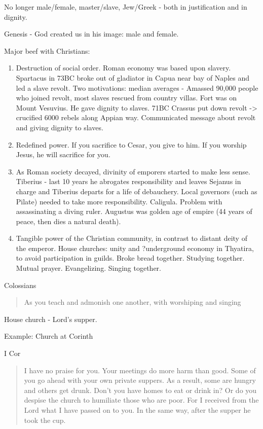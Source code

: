\documentclass[
]{book}
\begin{document}
No longer male/female, master/slave, Jew/Greek - both in justification and in dignity.

Genesis - God created us in his image: male and female.

Major beef with Christians:

\begin{enumerate}
\def\labelenumi{\arabic{enumi})}
\item
  Destruction of social order. Roman economy was based upon slavery. Spartacus in 73BC broke out of gladiator in Capua near bay of Naples and led a slave revolt. Two motivations: median averages - Amassed 90,000 people who joined revolt, most slaves rescued from country villas. Fort was on Mount Vesuvius. He gave dignity to slaves. 71BC Crassus put down revolt -\textgreater{} crucified 6000 rebels along Appian way. Communicated message about revolt and giving dignity to slaves.
\item
  Redefined power. If you sacrifice to Cesar, you give to him. If you worship Jesus, he will sacrifice for you.
\item
  As Roman society decayed, divinity of emporers started to make less sense. Tiberius - last 10 years he abrogates responsibility and leaves Sejanus in charge and Tiberius departs for a life of debauchery. Local governors (such as Pilate) needed to take more responsibility. Caligula. Problem with assassinating a diving ruler. Augustus was golden age of empire (44 years of peace, then dies a natural death).
\item
  Tangible power of the Christian community, in contrast to distant deity of the emperor. House churches: unity and ?underground economy in Thyatira, to avoid participation in guilds. Broke bread together. Studying together. Mutual prayer. Evangelizing. Singing together.
\end{enumerate}

Colossians

\begin{quote}
As you teach and admonish one another, with worshiping and singing
\end{quote}

House church - Lord's supper.

Example: Church at Corinth

I Cor

\begin{quote}
I have no praise for you. Your meetings do more harm than good. Some of you go ahead with your own private suppers. As a result, some are hungry and others get drunk. Don't you have homes to eat or drink in? Or do you despise the church to humiliate those who are poor. For I received from the Lord what I have passed on to you. In the same way, after the supper he took the cup.
\end{quote}
\end{document}

